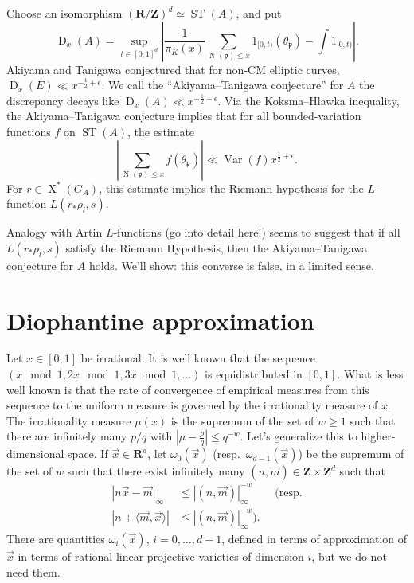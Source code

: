 \documentclass{article}
\DeclareMathOperator{\D}{D}
\DeclareMathOperator{\N}{N}
\DeclareMathOperator{\ST}{ST}
\DeclareMathOperator{\Var}{Var}
\DeclareMathOperator{\X}{X}
\newcommand{\bR}{\mathbf{R}}
\newcommand{\bZ}{\mathbf{Z}}
\newcommand{\fp}{\mathfrak{p}}
\newcommand{\vm}{\vec{m}}
\newcommand{\vx}{\vec{x}}
\begin{document}
Choose an isomorphism $(\bR/\bZ)^d \simeq \ST(A)$, and put 
\[
	\D_x(A) = \sup_{t\in [0,1]^d} \left| \frac{1}{\pi_K(x)} \sum_{\N(\fp) \leqslant x} 1_{[0,t)}(\theta_\fp) - \int 1_{[0,t)} \right| .
\]
Akiyama and Tanigawa conjectured that for non-CM elliptic curves, 
$\D_x(E) \ll x^{-\frac 1 2+\epsilon}$. We call the ``Akiyama--Tanigawa 
conjecture'' for $A$ the discrepancy decays like 
$\D_x(A) \ll x^{-\frac 1 2+\epsilon}$. Via the Koksma--Hlawka inequality, the 
Akiyama--Tanigawa conjecture implies that for all bounded-variation functions 
$f$ on $\ST(A)$, the estimate 
\[
	\left| \sum_{\N(\fp) \leqslant x} f(\theta_\fp)\right| \ll \Var(f)x^{\frac 1 2+\epsilon} .
\]
For $r\in \X^\ast(G_A)$, this estimate implies the Riemann hypothesis for the 
$L$-function $L(r_\ast \rho_l,s)$. 

Analogy with Artin $L$-functions (go into detail here!) seems to suggest that 
if all $L(r_\ast \rho_l,s)$ satisfy the Riemann Hypothesis, then the 
Akiyama--Tanigawa conjecture for $A$ holds. We'll show: this converse is false, 
in a limited sense. 





\section{Diophantine approximation}

Let $x\in [0,1]$ be irrational. It is well known that the sequence 
$(x\mod 1,2 x\mod 1,3 x\mod 1,\dots)$ is equidistributed in $[0,1]$. What is 
less well known is that the rate of convergence of empirical measures from this 
sequence to the uniform measure is governed by the irrationality measure of 
$x$. The irrationality measure $\mu(x)$ is the supremum of the set of 
$w\geqslant 1$ such that there are infinitely many $p/q$ with 
$\left| \mu - \frac p q\right| \leqslant q^{-w}$. Let's generalize this to 
higher-dimensional space. If $\vx\in \bR^d$, let $\omega_0(\vx)$ 
(resp.~$\omega_{d-1}(\vx)$) be the supremum of the set of $w$ such that there 
exist infinitely many $(n,\vm)\in \bZ\times \bZ^d$ such that 
\begin{align*}
	|n \vx - \vm|_\infty 
		&\leqslant |(n,\vm)|_\infty^{-w} \qquad \text{(resp.} \\
	|n + \langle \vm,\vx\rangle|
		&\leqslant |(n,\vm)|_\infty^{-w} \text{).}
\end{align*}
There are quantities $\omega_i(\vx)$, $i=0,\dots,d-1$, defined in terms of 
approximation of $\vx$ in terms of rational linear projective varieties of 
dimension $i$, but we do not need them.
\end{document}
